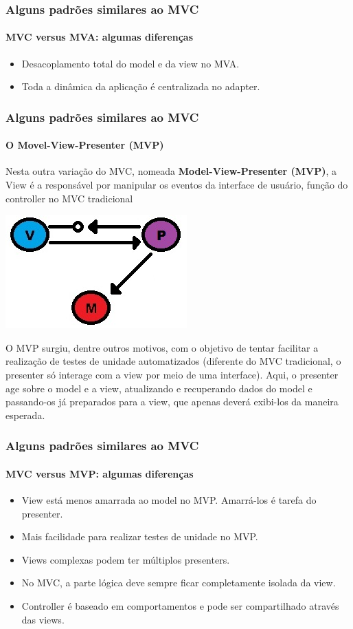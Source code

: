 \documentclass{beamer}
\begin{document}
\begin{frame}
\frametitle{Alguns padrões similares ao MVC}
\framesubtitle{MVC versus MVA: algumas diferenças}
\begin{itemize}
	\item Desacoplamento total do model e da view no MVA.
	\item Toda a dinâmica da aplicação é centralizada no adapter.
\end{itemize}
\end{frame}

\begin{frame}
\frametitle{Alguns padrões similares ao MVC}
\framesubtitle{O Movel-View-Presenter (MVP)}
	Nesta outra variação do MVC, nomeada \textbf{Model-View-Presenter (MVP)}, a View é a responsável por manipular os eventos da interface de usuário, função do controller no MVC tradicional
	\begin{center}
		\includegraphics[scale=0.3]{MVP.jpg}
	\end{center}
	O MVP surgiu, dentre outros motivos, com o objetivo de tentar facilitar a realização de testes de unidade automatizados (diferente do MVC tradicional, o presenter
	só interage com a view por meio de uma interface). Aqui, o presenter age sobre o model e a view, atualizando e recuperando dados do model e passando-os já preparados para a view, que apenas deverá exibi-los da maneira esperada.
\end{frame}

\begin{frame}
\frametitle{Alguns padrões similares ao MVC}
\framesubtitle{MVC versus MVP: algumas diferenças}
\begin{itemize}
	\item View está menos amarrada ao model no MVP. Amarrá-los é tarefa do presenter.\\
	\item Mais facilidade para realizar testes de unidade no MVP.\\
	\item Views complexas podem ter múltiplos presenters.
	\item No MVC, a parte lógica deve sempre ficar completamente isolada da view.
	\item Controller é baseado em comportamentos e pode ser compartilhado através das views.
\end{itemize}
\end{frame}
\end{document}
